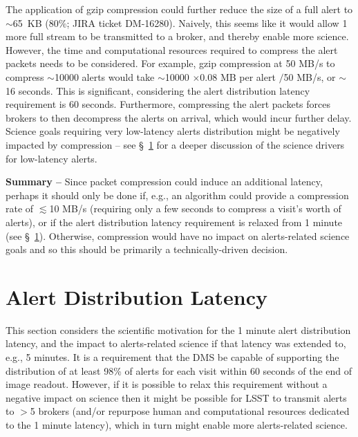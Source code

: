 \documentclass[DM,lsstdraft,authoryear,toc]{lsstdoc}
\begin{document}
The application of gzip compression could further reduce the size of a full alert to $\sim$65~KB (80\%; JIRA ticket DM-16280).
Naively, this seems like it would allow 1 more full stream to be transmitted to a broker, and thereby enable more science.
However, the time and computational resources required to compress the alert packets needs to be considered.
For example, gzip compression at 50 MB/s to compress $\sim$10000 alerts would take $\sim$10000 $\times$0.08 MB per alert $/$50 MB/s, or $\sim$16 seconds.
This is significant, considering the alert distribution latency requirement is 60 seconds. 
Furthermore, compressing the alert packets forces brokers to then decompress the alerts on arrival, which would incur further delay.
Science goals requiring very low-latency alerts distribution might be negatively impacted by compression -- see \S~\ref{sec:latency} for a deeper discussion of the science drivers for low-latency alerts.

{\bf Summary --} Since packet compression could induce an additional latency, perhaps it should only be done if, e.g., an algorithm could provide a compression rate of $\lesssim$10 MB/s (requiring only a few seconds to compress a visit's worth of alerts), or if the alert distribution latency requirement is relaxed from 1 minute (see \S~\ref{sec:latency}).
Otherwise, compression would have no impact on alerts-related science goals and so this should be primarily a technically-driven decision.




\clearpage
\section{Alert Distribution Latency} \label{sec:latency}

This section considers the scientific motivation for the 1 minute alert distribution latency, and the impact to alerts-related science if that latency was extended to, e.g., 5 minutes.
It is a requirement that the DMS be capable of supporting the distribution of at least 98\% of alerts for each visit within 60 seconds of the end of image readout.
However, if it is possible to relax this requirement without a negative impact on science then it might be possible for LSST to transmit alerts to $>$5 brokers (and/or repurpose human and computational resources dedicated to the 1 minute latency), which in turn might enable more alerts-related science.
\end{document}
